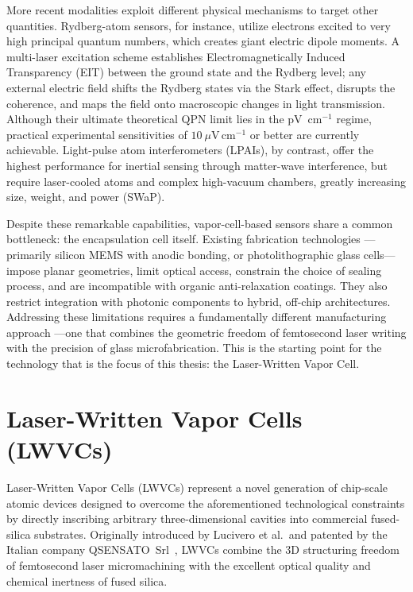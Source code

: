 More recent modalities exploit different physical mechanisms to target 
other quantities. Rydberg-atom sensors, for instance, utilize electrons 
excited to very high principal quantum numbers, which creates giant electric 
dipole moments. A multi-laser excitation scheme establishes 
Electromagnetically Induced Transparency (EIT) between the ground state 
and the Rydberg level; any external electric field shifts the Rydberg 
states via the Stark effect, disrupts the coherence, and maps the field 
onto macroscopic changes in light transmission. Although their ultimate 
theoretical \gls{QPN} limit lies in the pV~$\text{cm}^{-1}$ regime, practical 
experimental sensitivities of $10~\mu\text{V}\,\text{cm}^{-1}$ or better 
are currently achievable. Light-pulse atom interferometers (\gls{LPAI}s), by 
contrast, offer the highest performance for inertial sensing through 
matter-wave interference, but require laser-cooled atoms and complex 
high-vacuum chambers, greatly increasing size, weight, and power (SWaP).

Despite these remarkable capabilities, vapor-cell-based sensors share a common 
bottleneck: the encapsulation cell itself. Existing fabrication 
technologies ---primarily silicon MEMS with anodic bonding, or 
photolithographic glass cells--- impose planar geometries, limit optical 
access, constrain the choice of sealing process, and are incompatible 
with organic anti-relaxation coatings. They also restrict integration 
with photonic components to hybrid, off-chip architectures. Addressing 
these limitations requires a fundamentally different manufacturing approach 
---one that combines the geometric freedom of femtosecond laser writing 
with the precision of glass microfabrication. This is the starting point 
for the technology that is the focus of this thesis: the Laser-Written Vapor Cell.

\section{Laser-Written Vapor Cells (LWVCs)}
\label{sec:lwvcs}

Laser-Written Vapor Cells (LWVCs) represent a novel generation of chip-scale atomic devices 
designed to overcome the aforementioned technological constraints by directly inscribing 
arbitrary three-dimensional cavities into commercial fused-silica substrates. Originally 
introduced by Lucivero et al.\ and patented by the Italian company \mbox{QSENSATO~Srl}~\cite{lucivero2022,qsensato_web}, 
LWVCs combine the 3D structuring freedom of femtosecond laser micromachining with the 
excellent optical quality and chemical inertness of fused silica.

